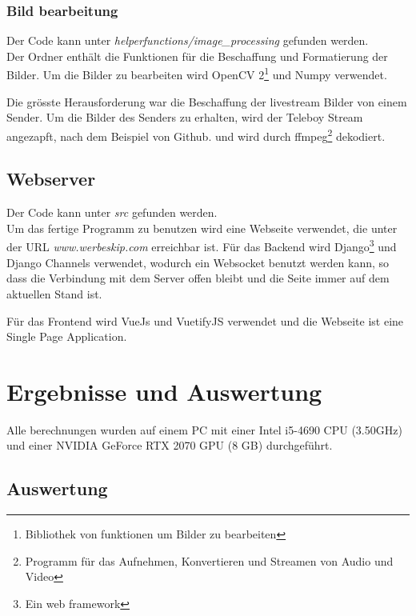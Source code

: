 \documentclass[12pt,a4paper]{report}
\begin{document}
\subsection{Bild bearbeitung}
Der Code kann unter \textit{helperfunctions/image\_processing} gefunden werden.\bigskip\\
Der Ordner enthält die Funktionen für die Beschaffung und Formatierung der Bilder.
Um die Bilder zu bearbeiten wird OpenCV 2\footnote{Bibliothek von funktionen um Bilder zu bearbeiten} und Numpy verwendet.

Die grösste Herausforderung war die Beschaffung der livestream Bilder von einem Sender.
Um die Bilder des Senders zu erhalten, wird der Teleboy Stream angezapft, nach dem Beispiel von Github.\cite{gittele} und
wird durch ffmpeg\footnote{Programm für das Aufnehmen, Konvertieren und Streamen von Audio und Video} dekodiert.

\section{Webserver}
Der Code kann unter \textit{src} gefunden werden.\bigskip\\
Um das fertige Programm zu benutzen wird eine Webseite verwendet, die unter der URL \textit{www.werbeskip.com} erreichbar ist.
Für das Backend wird Django\footnote{Ein web framework} und Django Channels verwendet, wodurch ein Websocket benutzt werden kann,
so dass die Verbindung mit dem Server offen bleibt und die Seite immer auf dem aktuellen Stand ist.

Für das Frontend wird VueJs und VuetifyJS verwendet und die Webseite ist eine Single Page Application.

\chapter{Ergebnisse und Auswertung}
Alle berechnungen wurden auf einem PC mit einer Intel i5-4690 CPU (3.50GHz) und einer NVIDIA GeForce RTX 2070 GPU (8 GB) durchgeführt.
\section{Auswertung}
\end{document}
